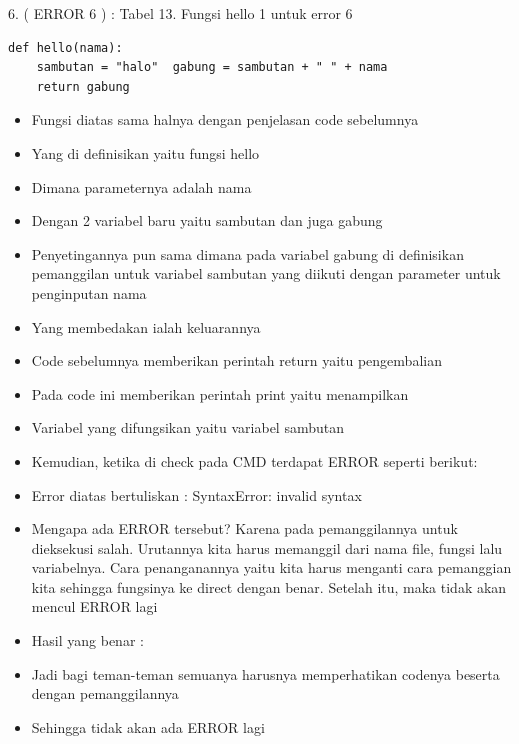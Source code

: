 6. ( ERROR 6 ) : 
Tabel 13. Fungsi hello 1 untuk error 6  
\begin{verbatim}
def hello(nama):
	sambutan = "halo"  gabung = sambutan + " " + nama 
	return gabung
\end{verbatim}
\begin{itemize}
\item Fungsi diatas sama halnya dengan penjelasan code sebelumnya 
\item Yang di definisikan yaitu fungsi hello 
\item Dimana parameternya adalah nama 
\item Dengan 2 variabel baru yaitu sambutan dan juga gabung 
\item Penyetingannya pun sama dimana pada variabel gabung di definisikan pemanggilan untuk variabel sambutan yang diikuti dengan parameter untuk penginputan nama 
\item Yang membedakan ialah keluarannya 
\item Code sebelumnya memberikan perintah return yaitu pengembalian 
\item Pada code ini memberikan perintah print yaitu menampilkan 
\item Variabel yang difungsikan yaitu variabel sambutan 
\item Kemudian, ketika di check pada CMD terdapat ERROR seperti berikut: 
\item Error diatas bertuliskan : SyntaxError: invalid syntax 
\item Mengapa ada ERROR tersebut? Karena pada pemanggilannya untuk dieksekusi salah. Urutannya kita harus memanggil dari nama file, fungsi lalu variabelnya. Cara penanganannya yaitu kita harus menganti cara pemanggian kita sehingga fungsinya ke direct dengan benar. Setelah itu, maka tidak akan mencul ERROR lagi 
\item Hasil yang benar : 
\item Jadi bagi teman-teman semuanya harusnya memperhatikan codenya beserta dengan pemanggilannya 
\item Sehingga tidak akan ada ERROR lagi 
\end{itemize}